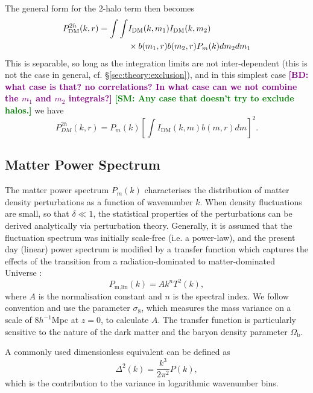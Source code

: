 \documentclass[5p]{elsarticle}
\newcommand{\bd}[1]{\textcolor{purple}{\textbf{[BD: #1]}}}
\newcommand{\sgm}[1]{\textcolor{green}{\textbf{[SM: #1]}}}
\begin{document}
The general form for the 2-halo term then becomes
\begin{align}
\label{eq:dmpower2a}
    P_{\rm DM}^{2h}(k,r) =  \int\int & I_{\rm DM}(k,m_1) I_{\rm DM}(k,m_2) \nonumber \\
    &\times b(m_1,r)b(m_2,r)P_{m}(k) dm_2 dm_1
\end{align}
This is separable, so long as the integration limits are not inter-dependent (this is not the case in general, cf. \S\ref{sec:theory:exclusion}), and in this simplest case \bd{what case is that? no correlations? In what case can we not combine the $m_1$ and $m_2$ integrals?} \sgm{Any case that doesn't try to exclude halos.} we have
\begin{equation}
    \label{eq:dmpower2}
    P_{DM}^{2h}(k,r) = P_m(k) \left[ \int  I_\text{DM}(k,m) b(m,r) dm \right]^2.
\end{equation}


\subsection{Matter Power Spectrum}
\label{sec:powerspec}
The matter power spectrum $P_m(k)$ characterises the distribution of matter 
density perturbations as a function of wavenumber $k$.
When density fluctuations are small, so that $\delta \ll 1$, the statistical properties of the perturbations can be derived analytically via perturbation theory. 
Generally, it is assumed that the fluctuation spectrum was initially scale-free (i.e. a power-law), and the present day (linear) power spectrum is modified by a transfer function which captures the effects of the transition from a radiation-dominated to matter-dominated Universe \citep{Bond1984}:
\begin{equation}
	\label{eq:powerfromtransfer}
	P_\text{m,lin}(k) = Ak^n T^2(k),
\end{equation}
where $A$ is the normalisation constant and $n$ is the spectral index. 
We follow convention and use the
parameter $\sigma_8$, which measures the mass variance on a scale of $8 h^{-1}$Mpc at $z=0$, 
to calculate $A$. The transfer function is particularly sensitive to the nature of
the dark matter and the baryon density parameter $\Omega_\text{b}$.

A commonly used dimensionless equivalent can be defined as 
\begin{equation}
    \Delta^2(k) = \frac{k^3}{2\pi^2} P(k),
\end{equation}
which is the contribution to the variance in logarithmic wavenumber bins.
\end{document}
